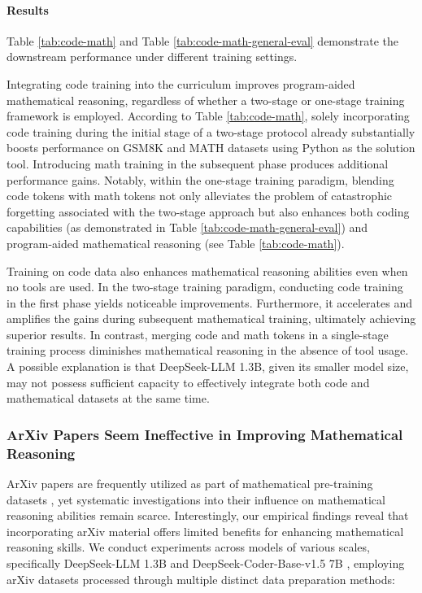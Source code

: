 \begin{itemize}[topsep=0pt]
\begin{itemize}[topsep=0pt]
\paragraph{Results}
Table \ref{tab:code-math} and Table \ref{tab:code-math-general-eval} demonstrate the downstream performance under different training settings.

Integrating code training into the curriculum improves program-aided mathematical reasoning, regardless of whether a two-stage or one-stage training framework is employed. According to Table \ref{tab:code-math}, solely incorporating code training during the initial stage of a two-stage protocol already substantially boosts performance on GSM8K and MATH datasets using Python as the solution tool. Introducing math training in the subsequent phase produces additional performance gains. Notably, within the one-stage training paradigm, blending code tokens with math tokens not only alleviates the problem of catastrophic forgetting associated with the two-stage approach but also enhances both coding capabilities (as demonstrated in Table \ref{tab:code-math-general-eval}) and program-aided mathematical reasoning (see Table \ref{tab:code-math}).

Training on code data also enhances mathematical reasoning abilities even when no tools are used. In the two-stage training paradigm, conducting code training in the first phase yields noticeable improvements. Furthermore, it accelerates and amplifies the gains during subsequent mathematical training, ultimately achieving superior results. In contrast, merging code and math tokens in a single-stage training process diminishes mathematical reasoning in the absence of tool usage. A possible explanation is that DeepSeek-LLM 1.3B, given its smaller model size, may not possess sufficient capacity to effectively integrate both code and mathematical datasets at the same time.

\subsubsection{ArXiv Papers Seem Ineffective in Improving Mathematical Reasoning}

ArXiv papers are frequently utilized as part of mathematical pre-training datasets \citep{minerva,gpt-f,llemma,mathpile}, yet systematic investigations into their influence on mathematical reasoning abilities remain scarce. Interestingly, our empirical findings reveal that incorporating arXiv material offers limited benefits for enhancing mathematical reasoning skills. We conduct experiments across models of various scales, specifically DeepSeek-LLM 1.3B and DeepSeek-Coder-Base-v1.5 7B \citep{deepseek-coder}, employing arXiv datasets processed through multiple distinct data preparation methods:


\end{itemize}
\end{itemize}
